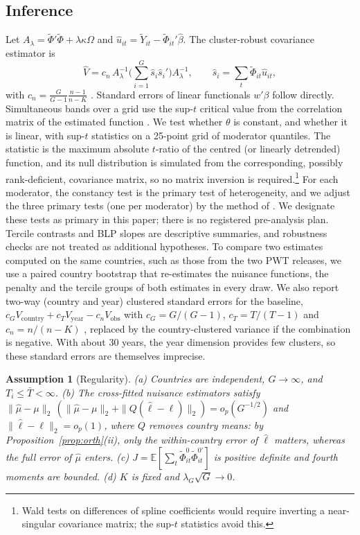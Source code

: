 \documentclass[pdflatex,sn-basic]{sn-jnl}%
\theoremstyle{thmstyleone}
\newtheorem{assumption}{Assumption}
\theoremstyle{thmstyletwo}
\newcommand{\E}{\mathbb{E}}
\begin{document}
\subsection{Inference}

Let $A_\lambda=\tilde\Phi'\tilde\Phi+\lambda\kappa\Omega$ and $\hat u_{it}=\tilde Y_{it}-\tilde\Phi_{it}'\hat\beta$. The cluster-robust covariance estimator is
\begin{equation}
\hat V=c_n\,A_\lambda^{-1}\Big(\sum_{i=1}^G \hat s_i\hat s_i'\Big)A_\lambda^{-1},\qquad \hat s_i=\sum_t\tilde\Phi_{it}\hat u_{it},
\label{eq:vcov}
\end{equation}
with $c_n=\frac{G}{G-1}\frac{n-1}{n-K}$ \citep{cameron2015cluster}. Standard errors of linear functionals $w'\beta$ follow directly. Simultaneous bands over a grid use the sup-$t$ critical value from the correlation matrix of the estimated function \citep{montiel2019bands}. We test whether $\theta$ is constant, and whether it is linear, with sup-$t$ statistics on a 25-point grid of moderator quantiles. The statistic is the maximum absolute $t$-ratio of the centred (or linearly detrended) function, and its null distribution is simulated from the corresponding, possibly rank-deficient, covariance matrix, so no matrix inversion is required.\footnote{Wald tests on differences of spline coefficients would require inverting a near-singular covariance matrix; the sup-$t$ statistics avoid this.} For each moderator, the constancy test is the primary test of heterogeneity, and we adjust the three primary tests (one per moderator) by the method of \citet{holm1979}. We designate these tests as primary in this paper; there is no registered pre-analysis plan. Tercile contrasts and BLP slopes are descriptive summaries, and robustness checks are not treated as additional hypotheses. To compare two estimates computed on the same countries, such as those from the two PWT releases, we use a paired country bootstrap that re-estimates the nuisance functions, the penalty and the tercile groups of both estimates in every draw. We also report two-way (country and year) clustered standard errors for the baseline, $c_GV_{\text{country}}+c_TV_{\text{year}}-c_nV_{\text{obs}}$ with $c_G=G/(G-1)$, $c_T=T/(T-1)$ and $c_n=n/(n-K)$ \citep{cameron2011twoway}, replaced by the country-clustered variance if the combination is negative. With about 30 years, the year dimension provides few clusters, so these standard errors are themselves imprecise.

\begin{assumption}[Regularity]\label{as:reg}
(a) Countries are independent, $G\to\infty$, and $T_i\le\bar T<\infty$. (b) The cross-fitted nuisance estimators satisfy $\|\hat\mu-\mu\|_2\,(\|\hat\mu-\mu\|_2+\|Q(\hat\ell-\ell)\|_2)=o_p(G^{-1/2})$ and $\|\hat\ell-\ell\|_2=o_p(1)$, where $Q$ removes country means: by Proposition~\ref{prop:orth}(ii), only the within-country error of $\hat\ell$ matters, whereas the full error of $\hat\mu$ enters. (c) $J=\E[\sum_t\tilde\Phi^0_{it}\tilde\Phi^{0\prime}_{it}]$ is positive definite and fourth moments are bounded. (d) $K$ is fixed and $\lambda_G\sqrt G\to0$.
\end{assumption}
\end{document}
